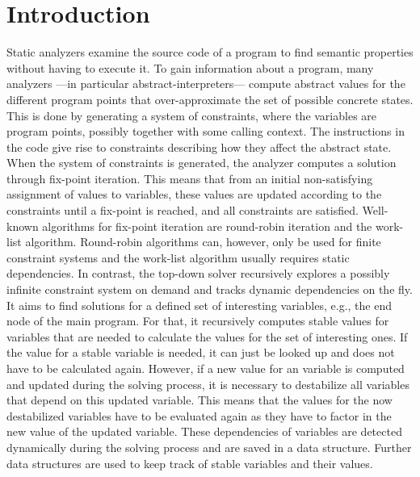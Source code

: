 \section{Introduction}
\label{sec:introduction}
Static analyzers examine the source code of a program to find semantic properties without having to execute it. To gain information about a program, many analyzers ---in particular abstract-interpreters--- compute abstract values for the different program points that over-approximate the set of possible concrete states. This is done by generating a system of constraints, where the variables are program points, possibly together with some calling context. The instructions in the code give rise to constraints describing how they affect the abstract state. When the system of constraints is generated, the analyzer computes a solution through fix-point iteration. This means that from an initial non-satisfying assignment of values to variables, these values are updated according to the constraints until a fix-point is reached, and all constraints are satisfied. Well-known algorithms for fix-point iteration are round-robin iteration and the work-list algorithm. Round-robin algorithms can, however, only be used for finite constraint systems and the work-list algorithm usually requires static dependencies. In contrast, the top-down solver recursively explores a possibly infinite constraint system on demand and tracks dynamic dependencies on the fly. It aims to find solutions for a defined set of interesting variables, e.g., the end node of the main program. For that, it recursively computes stable values for variables that are needed to calculate the values for the set of interesting ones. If the value for a stable variable is needed, it can just be looked up and does not have to be calculated again. However, if a new value for an variable is computed and updated during the solving process, it is necessary to destabilize all variables that depend on this updated variable. This means that the values for the now destabilized variables have to be evaluated again as they have to factor in the new value of the updated variable. These dependencies of variables are detected dynamically during the solving process and are saved in a data structure. Further data structures are used to keep track of stable variables and their values. 
